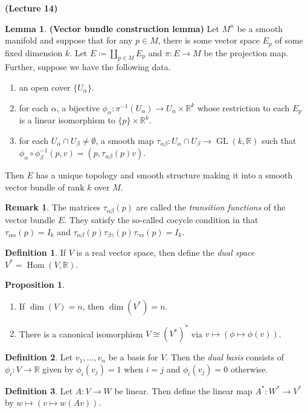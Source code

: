 \documentclass[10pt,letterpaper,cm]{nupset}
\theoremstyle{definition}
\newtheorem*{definition}{Definition}
\newtheorem{remark}{Remark}
\newtheorem{lemma}{Lemma}
\newtheorem{prop}{Proposition}
\newcommand{\R}{\mathbb R}
\newcommand{\1}{\mathbf{1}}
\newcommand{\0}{\vec 0}
\DeclareMathOperator{\GL}{GL}
\DeclareMathOperator{\Hom}{Hom}
\begin{document}
\begin{center}
{\textbf{(Lecture 14)}} 
\end{center}

\begin{lemma}{\textbf{(Vector bundle construction lemma)}}
Let $M^n$ be a smooth manifold and suppose that for any $p\in M$, there is some vector space $E_p$ of some fixed dimension $k$. Let $E\coloneqq  \coprod_{p\in M} E_p$ and $\pi : E \to M$ be the projection map. Further, suppose we have the following data.
\begin{enumerate}
\item an open cover $\{U_{\alpha}\}$.
\item for each $\alpha$, a bijective $\phi_{\alpha} : \pi^{-1}(U_{\alpha}) \to U_{\alpha} \times \R^k$ whose restriction to each $E_p$ is a linear isomorphism to $\{p\}\times \R^k$.
\item for each $U_{\alpha} \cap U_{\beta} \ne \emptyset$, a smooth map $\tau_{\alpha \beta} : U_{\alpha} \cap U_{\beta} \to \GL(k , \R)$ such that $\phi_{\alpha} \circ \phi_{\beta}^{-1}(p, v) = (p, \tau_{\alpha \beta}(p)v)$.
\end{enumerate}
Then $E$ has a unique topology and smooth structure making it into a smooth vector bundle of rank $k$ over $M$.
\end{lemma}

\begin{remark}
The matrices $\tau_{\alpha \beta}(p)$ are called the \textit{transition functions} of the vector bundle $E$. They satisfy the so-called cocycle condition in that $\tau_{\alpha \alpha}(p) = I_k$ and $\tau_{\alpha \beta}(p)\tau_{\beta \gamma}(p)\tau_{\gamma \alpha}(p) = I_k$.
\end{remark}

\begin{definition}
If $V$ is a real vector space, then define the \textit{dual space} $V^{\ast} = \Hom(V, \R)$.
\end{definition}
\begin{prop} $ $ 
\begin{enumerate}
\item If $\dim(V) =n$, then $\dim(V^{\ast}) = n$.
\item There is a canonical isomorphism $V \cong (V^{\ast})^{\ast}$ via $v \mapsto (\phi \mapsto \phi(v))$.
\end{enumerate}
\end{prop}
\begin{definition}
Let $v_1, \ldots, v_n$ be a basis for $V$. Then the \textit{dual basis} consists of $\phi_i : V \to \R$ given by $\phi_i(v_j) = 1$ when $i = j$ and $\phi_i(v_j)= 0$ otherwise.
\end{definition}
\begin{definition}
Let $A : V \to W$ be linear. Then define the linear map $A^{\ast} : W^{\ast} \to V^{\ast}$ by $w \mapsto (v \mapsto w(Av))$.
\end{definition}
\end{document}
